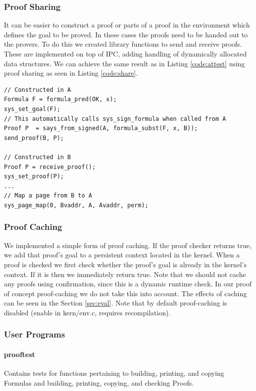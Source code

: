 \documentclass[10pt]{article}
\begin{document}
\subsubsection{Proof Sharing}\label{sec:share}
It can be easier to construct a proof or parts of a proof in the environment which defines the goal to be proved.  In these cases the proofs need to be handed out to the provers.  To do this we created library functions to send and receive proofs.  These are implemented on top of IPC, adding handling of dynamically allocated data structures.  We can achieve the same result as in Listing \ref{code:attest} using proof sharing as seen in Listing \ref{code:share}.
\begin{lstlisting}
// Constructed in A
Formula F = formula_pred(OK, x);
sys_set_goal(F);
// This automatically calls sys_sign_formula when called from A
Proof P  = says_from_signed(A, formula_subst(F, x, B));
send_proof(B, P);

// Constructed in B
Proof P = receive_proof();
sys_set_proof(P);
...
// Map a page from B to A
sys_page_map(0, Bvaddr, A, Avaddr, perm);
\end{lstlisting}

\subsubsection{Proof Caching}\label{sec:cache}
We implemented a simple form of proof caching.  If the proof checker returns true, we add that proof's goal to a persistent context located in the kernel.  When a proof is checked we first check whether the proof's goal is already in the kernel's context.  If it is then we immediately return true.  Note that we should not cache any proofs using confirmation, since this is a dynamic runtime check.  In our proof of concept proof-caching we do not take this into account.  The effects of caching can be seen in the Section \ref{sec:eval}.  Note that by default proof-caching is disabled (enable in \textsf{kern/env.c}, requires recompilation).

\subsubsection{User Programs}
\paragraph{prooftest} Contains tests for functions pertaining to building, printing, and copying Formulas and building, printing, copying, and checking Proofs.
\end{document}

